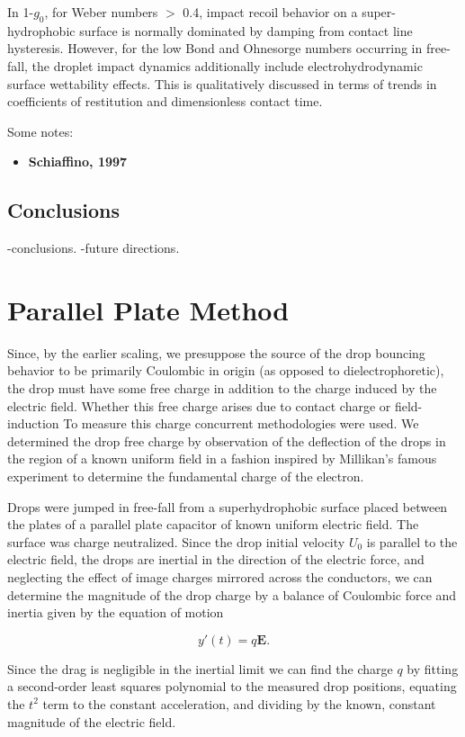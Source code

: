 \documentclass[12pt,a4paper,oneside]{book}
\begin{document}
In 1-$g_0$, for Weber numbers $>$ 0.4, impact recoil behavior on a super-hydrophobic surface is normally dominated by damping from contact line hysteresis. However, for the low Bond and Ohnesorge numbers occurring in free-fall, the droplet impact dynamics additionally include electrohydrodynamic surface wettability effects. This is qualitatively discussed in terms of trends in coefficients of restitution and dimensionless contact time.

Some notes:
\begin{itemize}
\item{\textbf{Schiaffino, 1997}} 
\end{itemize}

\section{Conclusions}
-conclusions.
-future directions.

\appendix
\appendixpage
\noappendicestocpagenum
\addappheadtotoc

\chapter{Parallel Plate Method}
\label{sec.drop_charge}
Since, by the earlier scaling, we presuppose the source of the drop bouncing behavior to be primarily Coulombic in origin (as opposed to dielectrophoretic), the drop must have some free charge in addition to the charge induced by the electric field. Whether this free charge arises due to contact charge or field-induction To measure this charge concurrent methodologies were used. We determined the drop free charge by observation of the deflection of the drops in the region of a known uniform field in a fashion inspired by Millikan's famous experiment to determine the fundamental charge of the electron.

Drops were jumped in free-fall from a superhydrophobic surface placed between the plates of a parallel plate capacitor of known uniform electric field. The surface was charge neutralized. Since the drop initial velocity $U_0$ is parallel to the electric field, the drops are inertial in the direction of the electric force, and neglecting the effect of image charges mirrored across the conductors, we can determine the magnitude of the drop charge by a balance of Coulombic force and inertia given by the equation of motion

\[ y'(t) = q\mathbf{E}. \]

Since the drag is negligible in the inertial limit we can find the charge $q$ by fitting a second-order least squares polynomial to the measured drop positions, equating the $t^2$ term to the constant acceleration, and dividing by the known, constant magnitude of the electric field.  
\end{document}
